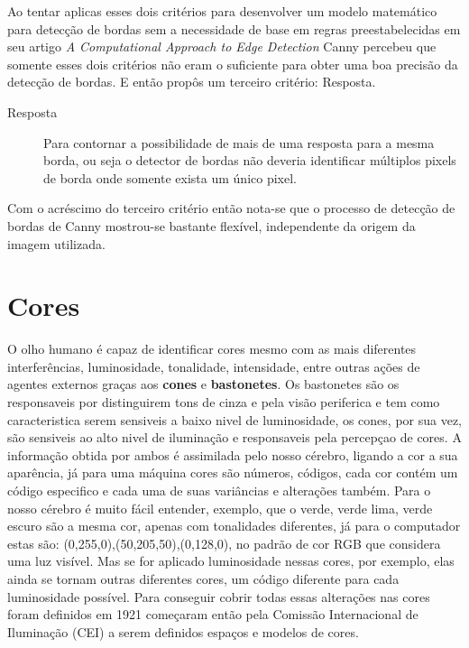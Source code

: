 Ao tentar aplicas esses dois critérios para desenvolver um modelo matemático para detecção de bordas sem a necessidade de base em regras preestabelecidas em seu artigo
\textit{ A Computational Approach to Edge Detection} Canny percebeu que somente esses dois critérios não eram o suficiente para obter uma boa precisão da detecção de bordas. E então propôs um terceiro critério: Resposta.
\begin{description}
	\item[Resposta] Para contornar a possibilidade de mais de uma resposta para a mesma borda, ou seja o detector de bordas não deveria identificar múltiplos pixels de borda onde somente exista um único pixel. \cite{Wangenheim:2014, Canny:1986, Vale:2002}
\end{description}

Com o acréscimo do terceiro critério então nota-se que o processo de detecção de bordas de Canny
mostrou-se bastante flexível, independente da origem da imagem utilizada\cite{Vale:2002}.









\section{Cores} \label{Sec:Cores}


O olho humano é capaz de identificar cores mesmo com as mais diferentes interferências, luminosidade, tonalidade, intensidade, entre outras ações de agentes externos graças aos \textbf{cones} e \textbf{bastonetes}. Os bastonetes são os responsaveis por distinguirem tons de cinza e pela visão periferica e tem como caracteristica serem sensiveis a baixo nivel de luminosidade\cite{Azevedo:2003}, os cones, por sua vez, são sensiveis ao alto nivel de iluminação e responsaveis pela percepçao de cores\cite{Azevedo:2003}. A informação obtida por ambos é assimilada pelo nosso  cérebro, ligando a cor a sua aparência, já para uma máquina cores são números, códigos, cada cor contém um código especifico e cada uma de suas variâncias e alterações também. Para o nosso cérebro é muito fácil entender, exemplo, que o verde, verde lima, verde escuro são a mesma cor, apenas com tonalidades diferentes, já para o computador estas são: (0,255,0),(50,205,50),(0,128,0), no padrão de cor RGB que considera uma luz visível. Mas se for aplicado luminosidade nessas cores, por exemplo, elas ainda se tornam outras diferentes cores, um código diferente para cada luminosidade possível. Para conseguir cobrir todas essas alterações nas cores foram definidos em 1921 começaram então pela Comissão Internacional de Iluminação (CEI) a serem definidos espaços e modelos de cores\cite{Souto:2003}.

